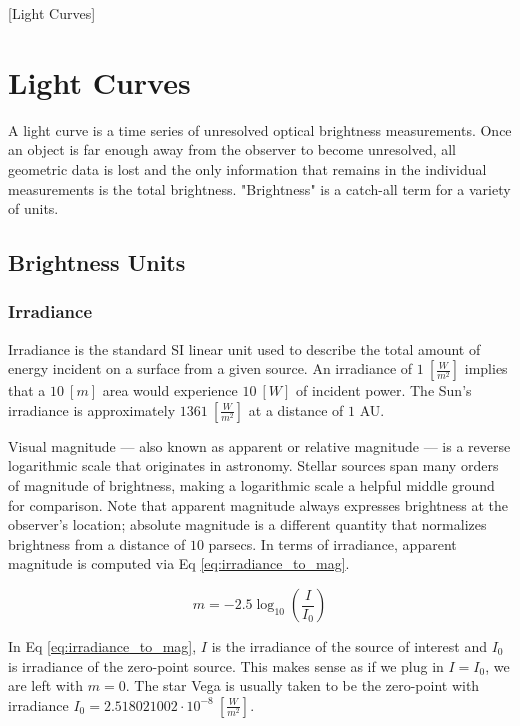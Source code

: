 [Light Curves]
\graphicspath{{/Users/liamrobinson/Documents/PyLightCurves/docs/build/html/_images}}

\chapter{Light Curves}

A light curve is a time series of unresolved optical brightness measurements. Once an object is far
enough away from the observer to become unresolved, all geometric data is lost and the only
information that remains in the individual measurements is the total brightness. "Brightness" is a
catch-all term for a variety of units. 

\section{Brightness Units}

\subsection{Irradiance}

Irradiance is the standard SI linear unit used to describe the total amount of energy incident on a
surface from a given source. An irradiance of $1 \: \left[ \frac{W}{m^2} \right]$ implies that a $10
\: [m]$ area would experience $10 \: [W]$ of incident power. The Sun's irradiance is approximately
$1361 \: \left[ \frac{W}{m^2} \right]$ at a distance of $1$ AU. 

Visual magnitude ---  also known as apparent or relative magnitude --- is a reverse logarithmic scale
that originates in astronomy. Stellar sources span many orders of magnitude of brightness, making a
logarithmic scale a helpful middle ground for comparison. Note that apparent magnitude always
expresses brightness at the observer's location; absolute magnitude is a different quantity that
normalizes brightness from a distance of $10$ parsecs. In terms of irradiance, apparent magnitude
is computed via Eq \ref{eq:irradiance_to_mag}.

\begin{equation} \label{eq:irradiance_to_mag}
  m = -2.5 \log_{10}\left( \frac{I}{I_0} \right)
\end{equation}

In Eq \ref{eq:irradiance_to_mag}, $I$ is the irradiance of the source of interest and $I_0$ is
irradiance of the zero-point source. This makes sense as if we plug in $I = I_0$, we are left with
$m=0$. The star Vega is usually taken to be the zero-point with irradiance $I_0 = 2.518021002\cdot
10^{-8} \: \left[ \frac{W}{m^2} \right]$.

